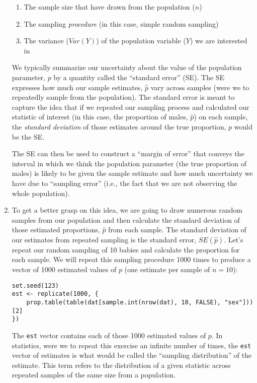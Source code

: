 \documentclass[a4paper,12pt]{article}
\begin{document}
\begin{enumerate}
\begin{enumerate}
\item The sample size that have drawn from the population ($n$)
\item The sampling \textit{procedure} (in this case, simple random sampling)
\item The variance ($Var(Y)$) of the population variable ($Y$) we are interested in
\end{enumerate}

\noindent We typically summarize our uncertainty about the value of the population parameter, $p$ by a quantity called the ``standard error'' (SE). The SE expresses how much our sample estimates, $\hat{p}$ vary across samples (were we to repeatedly sample from the population). The standard error is meant to capture the idea that if we repeated our sampling process and calculated our statistic of interest (in this case, the proportion of males, $\hat{p}$) on each sample, the \textit{standard deviation} of those estimates around the true proportion, $p$ would be the SE.

The SE can then be used to construct a ``margin of error'' that conveys the interval in which we think the population parameter (the true proportion of males) is likely to be given the sample estimate and how much uncertainty we have due to ``sampling error'' (i.e., the fact that we are not observing the whole population).

\item To get a better grasp on this idea, we are going to draw numerous random samples from our population and then calculate the standard deviation of those estimated proportions, $\hat{p}$ from each sample. The standard deviation of our estimates from repeated sampling is the standard error, $SE(\hat{p})$. Let's repeat our random sampling of 10 babies and calculate the proportion for each sample. We will repeat this sampling procedure 1000 times to produce a vector of 1000 estimated values of $p$ (one estimate per sample of $n=10$):

\begin{verbatim}
set.seed(123)
est <- replicate(1000, {
    prop.table(table(dat[sample.int(nrow(dat), 10, FALSE), "sex"]))[2]
})
\end{verbatim}

\noindent The \texttt{est} vector contains each of those 1000 estimated values of $p$. In statistics, were we to repeat this exercise an infinite number of times, the \texttt{est} vector of estimates is what would be called the ``sampling distribution'' of the estimate. This term refers to the distribution of a given statistic across repeated samples of the same size from a population.


\end{enumerate}
\end{document}
